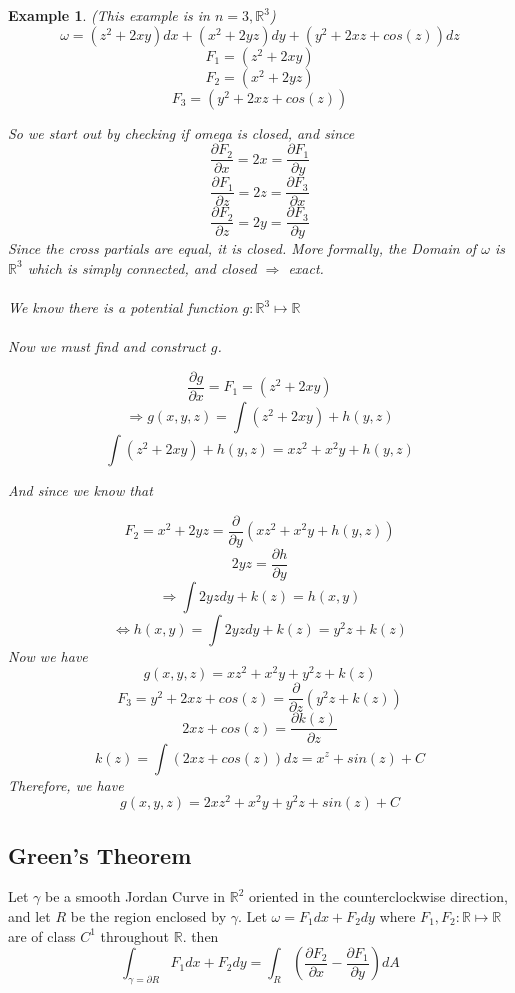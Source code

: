 \documentclass[12pt]{article}
\theoremstyle{plain}
\newtheorem{example}[theorem]{Example}
\theoremstyle{definition}
\begin{document}
	\begin{example}
		(This example is in $n=3, \mathbb{R}^3$)\\

		$$\omega = (z^2 + 2xy)dx + (x^2 +2yz)dy + (y^2 + 2xz + cos(z))dz$$
		$$F_1 = (z^2 + 2xy)$$
		$$F_2 = (x^2 +2yz)$$
		$$F_3 = (y^2 + 2xz + cos(z))$$

		So we start out by checking if omega is closed, and since
		$$\frac{\partial F_2}{\partial x} = 2x = \frac{\partial F_1}{\partial y}$$
		$$\frac{\partial F_1}{\partial z} = 2z = \frac{\partial F_3}{\partial x}$$
		$$\frac{\partial F_2}{\partial z} = 2y = \frac{\partial F_3}{\partial y}$$
		Since the cross partials are equal, it is closed. More formally, the Domain of $\omega$ is $\mathbb{R}^3$ which is simply connected, and closed $\Longrightarrow$ exact.\\
		\\
		We know there is a potential function $g:\mathbb{R}^3 \mapsto \mathbb{R}$\\
		\\
		Now we must find and construct $g$.

		$$\frac{\partial g}{\partial x} = F_1 = (z^2 + 2xy)$$
		$$\Longrightarrow g(x,y,z) = \int (z^2 + 2xy) + h(y,z)$$
		$$\int (z^2 + 2xy) + h(y,z) =  xz^2 + x^2y + h(y,z)$$

		And since we know that

		$$F_2 = x^2 + 2yz = \frac{\partial}{\partial y} (xz^2 + x^2y + h(y,z))$$
		$$2yz = \frac{\partial h}{\partial y}$$
		$$\Longrightarrow \int 2yz dy + k(z) = h(x,y)$$
		$$\Longleftrightarrow h(x,y) = \int 2yz dy + k(z) = y^2 z + k(z)$$
		Now we have
		$$g(x,y,z) = xz^2 + x^2y + y^2 z + k(z)$$
		$$F_3 = y^2 + 2xz + cos(z) = \frac{\partial}{\partial z}(y^2 z + k(z))$$
		$$2xz + cos(z) = \frac{\partial k(z)}{\partial z}$$
		$$k(z) = \int (2xz + cos(z)) dz = x^z + sin(z) + C$$
		Therefore, we have
		$$g(x,y,z) = 2xz^2 + x^2 y + y^2 z + sin(z) + C$$

	\end{example}

	\subsection{Green's Theorem}

	\begin{Theorem}
		Let $\gamma$ be a smooth Jordan Curve in $\mathbb{R}^2$ oriented in the counterclockwise direction, and let $R$ be the region enclosed by $\gamma$. Let $\omega = F_1 dx + F_2 dy$ where $F_1, F_2 : \mathbb{R} \mapsto \mathbb{R}$ are of class $C^1$ throughout $\mathbb{R}$. then
		$$\int_{\gamma = \partial R} F_1 dx + F_2 dy = \int_R (\frac{\partial F_2}{\partial x} - \frac{\partial F_1}{\partial y})dA$$
	\end{Theorem}
\end{document}
